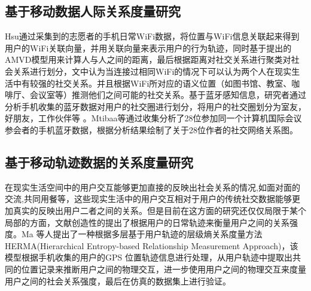 \subsection{基于移动数据人际关系度量研究}
Hsu通过采集到的志愿者的手机日常WiFi数据，将位置与WiFi信息关联起来得到用户的WiFi关联向量，并用关联向量来表示用户的行为轨迹，同时基于提出的AMVD模型用来计算人与人之间的距离，最后根据距离对社交关系进行聚类对社会关系进行划分，文中认为当连接过相同WiFi的情况下可以认为两个人在现实生活中有较强的社交关系。并且根据WiFi所对应的语义位置（如图书馆、教室、咖啡厅、会议室等）推测他们之间可能的社交关系。基于蓝牙感知信息，研究者通过分析手机收集的蓝牙数据对用户的社交圈进行划分，将用户的社交圈划分为室友，好朋友，工作伙伴等
。Mtibaa等通过收集分析了28位参加同一个计算机国际会议参会者的手机蓝牙数据，根据分析结果绘制了关于28位作者的社交网络关系图。
\subsection{基于移动轨迹数据的关系度量研究}
在现实生活空间中的用户交互能够更加直接的反映出社会关系的情况,如面对面的交流,共同用餐等，这些现实生活中的用户交互相对于用户的传统社交数据能够更加真实的反映出用户二者之间的关系。但是目前在这方面的研究还仅仅局限于某个局部的方面，文献\cite{ma2014effective}创造性的提出了根据用户的日常轨迹来衡量用户之间的关系强度。Ma 等人提出了一种根据多层基于用户轨迹的层级熵关系度量方法HERMA(Hierarchical Entropy-based Relationship Measurement Approach)，该模型根据手机收集的用户的GPS 位置轨迹信息进行处理，从用户轨迹中提取出共同的位置记录来推断用户之间的物理交互，进一步使用用户之间的物理交互来度量用户之间的社会关系强度，最后在仿真的数据集上进行验证。



